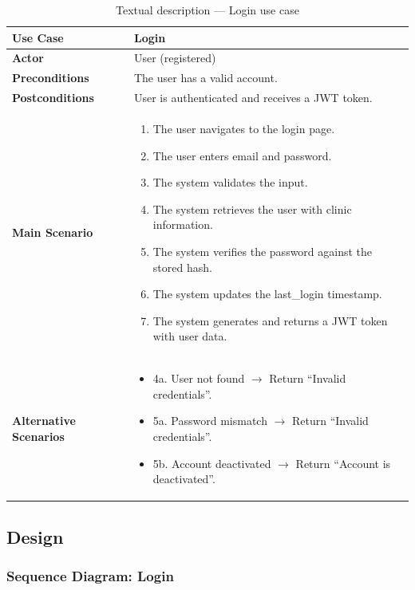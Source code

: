\documentclass[12pt,a4paper,oneside]{report}
\begin{document}
\begin{table}[H]
\centering
\caption{Textual description — Login use case}
\label{tab:uc_login}
\begin{tabular}{|p{3.5cm}|p{9.5cm}|}
\hline
\textbf{Use Case} & Login \\
\hline
\textbf{Actor} & User (registered) \\
\hline
\textbf{Preconditions} & The user has a valid account. \\
\hline
\textbf{Postconditions} & User is authenticated and receives a JWT token. \\
\hline
\textbf{Main Scenario} &
\begin{enumerate}[leftmargin=*, nosep]
    \item The user navigates to the login page.
    \item The user enters email and password.
    \item The system validates the input.
    \item The system retrieves the user with clinic information.
    \item The system verifies the password against the stored hash.
    \item The system updates the last\_login timestamp.
    \item The system generates and returns a JWT token with user data.
\end{enumerate} \\
\hline
\textbf{Alternative Scenarios} &
\begin{itemize}[leftmargin=*, nosep]
    \item 4a. User not found $\rightarrow$ Return ``Invalid credentials''.
    \item 5a. Password mismatch $\rightarrow$ Return ``Invalid credentials''.
    \item 5b. Account deactivated $\rightarrow$ Return ``Account is deactivated''.
\end{itemize} \\
\hline
\end{tabular}
\end{table}

\subsection{Design}

\subsubsection{Sequence Diagram: Login}
\end{document}
